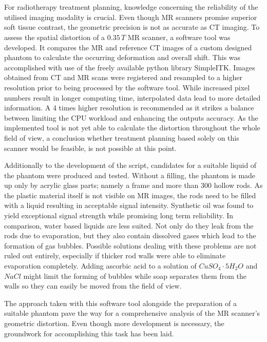 \let\oldcleardoublepage\cleardoublepage
\renewcommand\cleardoublepage{}

\chapter*{\abstractname}
For radiotherapy treatment planning, knowledge concerning the reliability of the utilised imaging modality is crucial.
Even though MR scanners promise superior soft tissue contrast, the geometric precision is not as accurate as CT imaging.
To assess the spatial distortion of a $0.35\, T$ MR scanner, a software tool was developed.
It compares the MR and reference CT images of a custom designed phantom to calculate the occurring deformation and overall shift.
This was accomplished with use of the freely available python library {SimpleITK}.
Images obtained from CT and MR scans were registered and resampled to a higher resolution prior to being processed by the software tool.
While increased pixel numbers result in longer computing time, interpolated data lead to more detailed information.
A 4 times higher resolution is recommended as it strikes a balance between limiting the CPU workload and enhancing the outputs accuracy.
As the implemented tool is not yet able to calculate the distortion throughout the whole field of view, a conclusion whether treatment planning based solely on this scanner would be feasible, is not possible at this point.

Additionally to the development of the script, candidates for a suitable liquid of the phantom were produced and tested.
Without a filling, the phantom is made up only by acrylic glass parts; namely a frame and more than 300 hollow rods.
As the plastic material itself is not visible on MR images, the rods need to be filled with a liquid resulting in acceptable signal intensity.
Synthetic oil was found to yield exceptional signal strength while promising long term reliability.
In comparison, water based liquids are less suited.
Not only do they leak from the rods due to evaporation, but they also contain dissolved gases which lead to the formation of gas bubbles.
Possible solutions dealing with these problems are not ruled out entirely, especially if thicker rod walls were able to eliminate evaporation completely.
Adding ascorbic acid to a solution of $CuSO_4\cdot5H_2O$ and $NaCl$ might limit the forming of bubbles while soap separates them from the walls so they can easily be moved from the field of view.

The approach taken with this software tool alongside the preparation of a suitable phantom pave the way for a comprehensive analysis of the MR scanner's geometric distortion.
Even though more development is necessary, the groundwork for accomplishing this task has been laid.


\let\cleardoublepage\oldcleardoublepage
\newpage
